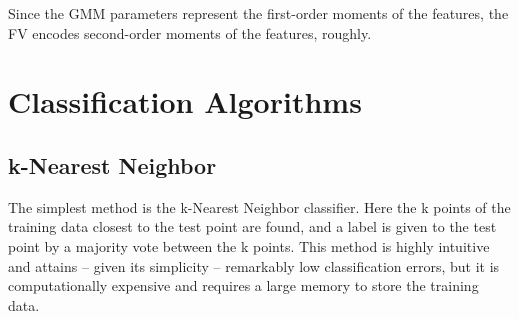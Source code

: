 \documentclass[12pt]{article}
\numberwithin{equation}{section}
\numberwithin{table}{section}
\numberwithin{figure}{section}
\begin{document}
\noindent
Since the GMM parameters represent the first-order moments of the features, the FV encodes second-order moments of the features, roughly.








\section{Classification Algorithms} \label{classalgs}

\subsection{k-Nearest Neighbor } \label{knn}
The simplest method is the k-Nearest Neighbor classifier. Here the k points of the training data closest to the test point are found, and a label is given to the test point by a majority vote between the k points. This method is highly intuitive and attains – given its simplicity – remarkably low classification errors, but it is computationally expensive and requires a large memory to store the training data.


\end{document}
